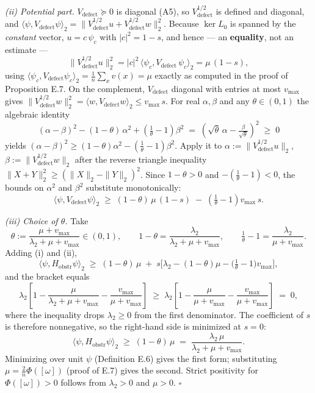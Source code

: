 \documentclass[
]{article}
\begin{document}
\emph{(ii) Potential part.} \(V_{\mathrm{defect}} \succeq 0\) is diagonal (A5), so \(V_{\mathrm{defect}}^{1/2}\) is defined and diagonal, and \(\langle\psi, V_{\mathrm{defect}}\psi\rangle_2 = \|V_{\mathrm{defect}}^{1/2}u + V_{\mathrm{defect}}^{1/2}w\|_2^2\). Because \(\ker L_0\) is spanned by the \emph{constant} vector, \(u = c\,\psi_c\) with \(|c|^2 = 1-s\), and hence --- an \textbf{equality}, not an estimate ---
\[\|V_{\mathrm{defect}}^{1/2}u\|_2^2 = |c|^2\,\langle \psi_c, V_{\mathrm{defect}}\,\psi_c\rangle_2 = \mu\,(1-s),\]
using \(\langle \psi_c, V_{\mathrm{defect}}\psi_c\rangle_2 = \tfrac1n\sum_x v(x) = \mu\) exactly as computed in the proof of Proposition E.7. On the complement, \(V_{\mathrm{defect}}\) diagonal with entries at most \(v_{\max}\) gives \(\|V_{\mathrm{defect}}^{1/2}w\|_2^2 = \langle w, V_{\mathrm{defect}}w\rangle_2 \le v_{\max}\,s\).
For real \(\alpha, \beta\) and any \(\theta \in (0,1)\) the algebraic identity
\[(\alpha-\beta)^2 - (1-\theta)\,\alpha^2 + \left(\tfrac1\theta - 1\right)\beta^2 \;=\; \left(\sqrt{\theta}\,\alpha - \tfrac{\beta}{\sqrt\theta}\right)^{2} \;\ge\; 0\]
yields \((\alpha-\beta)^2 \ge (1-\theta)\alpha^2 - (\tfrac1\theta - 1)\beta^2\). Apply it to \(\alpha := \|V_{\mathrm{defect}}^{1/2}u\|_2\), \(\beta := \|V_{\mathrm{defect}}^{1/2}w\|_2\) after the reverse triangle inequality \(\|X + Y\|_2^2 \ge (\|X\|_2 - \|Y\|_2)^2\). Since \(1-\theta > 0\) and \(-(\tfrac1\theta-1) < 0\), the bounds on \(\alpha^2\) and \(\beta^2\) substitute monotonically:
\[\langle\psi, V_{\mathrm{defect}}\psi\rangle_2 \;\ge\; (1-\theta)\,\mu\,(1-s) \;-\; \left(\tfrac1\theta - 1\right) v_{\max}\, s .\]

\emph{(iii) Choice of \(\theta\).} Take
\[\theta := \frac{\mu + v_{\max}}{\lambda_2 + \mu + v_{\max}} \in (0,1), \qquad 1-\theta = \frac{\lambda_2}{\lambda_2+\mu+v_{\max}}, \qquad \tfrac1\theta - 1 = \frac{\lambda_2}{\mu+v_{\max}} .\]
Adding (i) and (ii),
\[\langle\psi, H_{\mathrm{obstr}}\psi\rangle_2 \;\ge\; (1-\theta)\,\mu \;+\; s\Big[\lambda_2 - (1-\theta)\mu - \big(\tfrac1\theta-1\big)v_{\max}\Big],\]
and the bracket equals
\[\lambda_2\left[1 - \frac{\mu}{\lambda_2+\mu+v_{\max}} - \frac{v_{\max}}{\mu+v_{\max}}\right] \;\ge\; \lambda_2\left[1 - \frac{\mu}{\mu+v_{\max}} - \frac{v_{\max}}{\mu+v_{\max}}\right] \;=\; 0,\]
where the inequality drops \(\lambda_2 \ge 0\) from the first denominator. The coefficient of \(s\) is therefore nonnegative, so the right-hand side is minimized at \(s = 0\):
\[\langle\psi, H_{\mathrm{obstr}}\psi\rangle_2 \;\ge\; (1-\theta)\,\mu \;=\; \frac{\lambda_2\,\mu}{\lambda_2+\mu+v_{\max}} .\]
Minimizing over unit \(\psi\) (Definition E.6) gives the first form; substituting \(\mu = \tfrac{2}{n}\Phi([\omega])\) (proof of E.7) gives the second. Strict positivity for \(\Phi([\omega]) > 0\) follows from \(\lambda_2 > 0\) and \(\mu > 0\). \(\square\)
\end{document}
